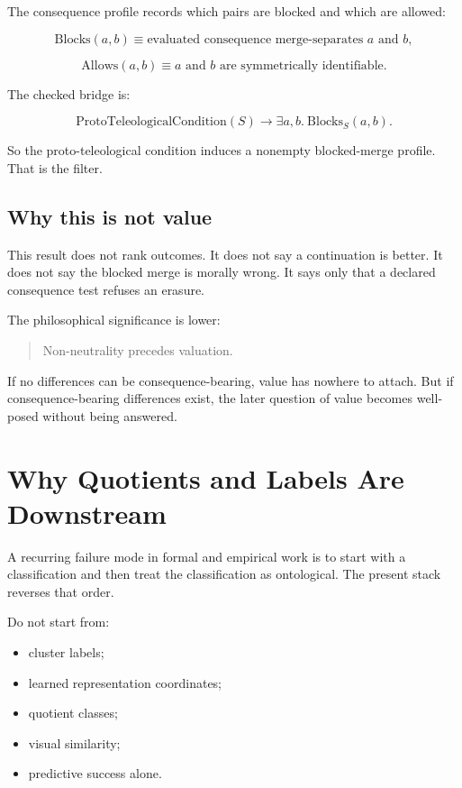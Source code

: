 \documentclass[11pt]{article}
\begin{document}
The consequence profile records which pairs are blocked and which are allowed:

\[
\mathrm{Blocks}(a,b) \equiv
\text{evaluated consequence merge-separates } a \text{ and } b,
\]

\[
\mathrm{Allows}(a,b) \equiv
a \text{ and } b \text{ are symmetrically identifiable}.
\]

The checked bridge is:

\[
\mathrm{ProtoTeleologicalCondition}(S)
\to
\exists a,b.\ \mathrm{Blocks}_S(a,b).
\]

So the proto-teleological condition induces a nonempty blocked-merge profile.
That is the filter.

\subsection{Why this is not value}

This result does not rank outcomes. It does not say a continuation is better.
It does not say the blocked merge is morally wrong. It says only that a
declared consequence test refuses an erasure.

The philosophical significance is lower:

\begin{quote}
Non-neutrality precedes valuation.
\end{quote}

If no differences can be consequence-bearing, value has nowhere to attach. But
if consequence-bearing differences exist, the later question of value becomes
well-posed without being answered.

\section{Why Quotients and Labels Are Downstream}

A recurring failure mode in formal and empirical work is to start with a
classification and then treat the classification as ontological. The present
stack reverses that order.

Do not start from:

\begin{itemize}[leftmargin=*]
  \item cluster labels;
  \item learned representation coordinates;
  \item quotient classes;
  \item visual similarity;
  \item predictive success alone.
\end{itemize}
\end{document}
